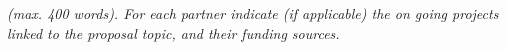 % 
%
%
%

\emph{(max. 400 words). For each partner indicate (if applicable) the on going
  projects linked to the proposal topic, and their  funding sources.}  





% 
